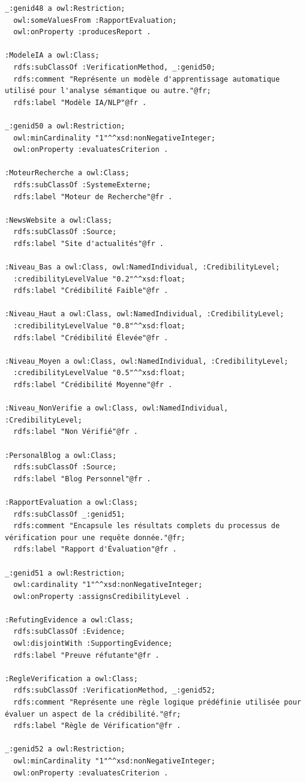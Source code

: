 \documentclass[9pt,twocolumn,twoside,french]{article}
\begin{document}
\begin{lstlisting}[language=Turtle,basicstyle=\ttfamily\tiny,frame=single]
_:genid48 a owl:Restriction;
  owl:someValuesFrom :RapportEvaluation;
  owl:onProperty :producesReport .

:ModeleIA a owl:Class;
  rdfs:subClassOf :VerificationMethod, _:genid50;
  rdfs:comment "Représente un modèle d'apprentissage automatique utilisé pour l'analyse sémantique ou autre."@fr;
  rdfs:label "Modèle IA/NLP"@fr .

_:genid50 a owl:Restriction;
  owl:minCardinality "1"^^xsd:nonNegativeInteger;
  owl:onProperty :evaluatesCriterion .

:MoteurRecherche a owl:Class;
  rdfs:subClassOf :SystemeExterne;
  rdfs:label "Moteur de Recherche"@fr .

:NewsWebsite a owl:Class;
  rdfs:subClassOf :Source;
  rdfs:label "Site d'actualités"@fr .

:Niveau_Bas a owl:Class, owl:NamedIndividual, :CredibilityLevel;
  :credibilityLevelValue "0.2"^^xsd:float;
  rdfs:label "Crédibilité Faible"@fr .

:Niveau_Haut a owl:Class, owl:NamedIndividual, :CredibilityLevel;
  :credibilityLevelValue "0.8"^^xsd:float;
  rdfs:label "Crédibilité Élevée"@fr .

:Niveau_Moyen a owl:Class, owl:NamedIndividual, :CredibilityLevel;
  :credibilityLevelValue "0.5"^^xsd:float;
  rdfs:label "Crédibilité Moyenne"@fr .

:Niveau_NonVerifie a owl:Class, owl:NamedIndividual, :CredibilityLevel;
  rdfs:label "Non Vérifié"@fr .

:PersonalBlog a owl:Class;
  rdfs:subClassOf :Source;
  rdfs:label "Blog Personnel"@fr .

:RapportEvaluation a owl:Class;
  rdfs:subClassOf _:genid51;
  rdfs:comment "Encapsule les résultats complets du processus de vérification pour une requête donnée."@fr;
  rdfs:label "Rapport d'Évaluation"@fr .

_:genid51 a owl:Restriction;
  owl:cardinality "1"^^xsd:nonNegativeInteger;
  owl:onProperty :assignsCredibilityLevel .

:RefutingEvidence a owl:Class;
  rdfs:subClassOf :Evidence;
  owl:disjointWith :SupportingEvidence;
  rdfs:label "Preuve réfutante"@fr .

:RegleVerification a owl:Class;
  rdfs:subClassOf :VerificationMethod, _:genid52;
  rdfs:comment "Représente une règle logique prédéfinie utilisée pour évaluer un aspect de la crédibilité."@fr;
  rdfs:label "Règle de Vérification"@fr .

_:genid52 a owl:Restriction;
  owl:minCardinality "1"^^xsd:nonNegativeInteger;
  owl:onProperty :evaluatesCriterion .


\end{lstlisting}
\end{document}
